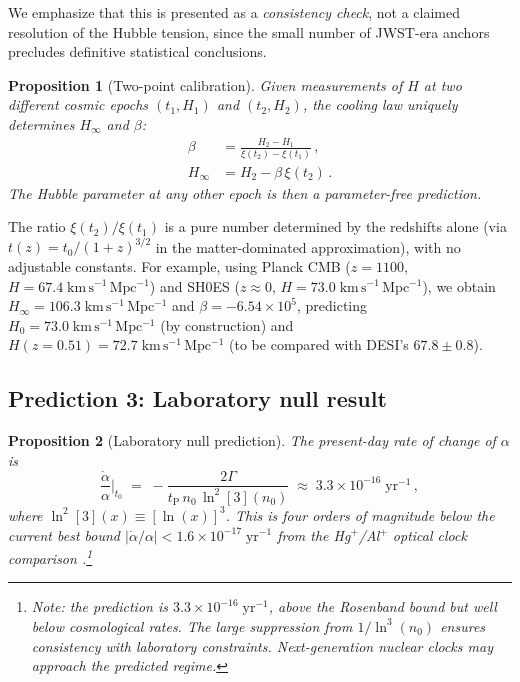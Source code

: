 \documentclass[twocolumn,showpacs,preprintnumbers,amsmath,amssymb,prd]{revtex4-2}
\newtheorem{proposition}{Proposition}
\newcommand{\lnq}{\ln^2}
\newcommand{\tP}{t_{\mathrm{P}}}
\newcommand{\Hinf}{H_{\infty}}
\begin{document}
We emphasize that this is presented as a \emph{consistency check},
not a claimed resolution of the Hubble tension, since the small
number of JWST-era anchors precludes definitive statistical
conclusions.

\begin{proposition}[Two-point calibration]\label{prop:twopoint}
Given measurements of $H$ at two different cosmic epochs
$(t_1, H_1)$ and $(t_2, H_2)$, the cooling law uniquely determines
$\Hinf$ and $\beta$:
\begin{align}
  \beta &= \frac{H_2 - H_1}{\xi(t_2) - \xi(t_1)}\,, \label{eq:beta_twopoint} \\
  \Hinf &= H_2 - \beta\,\xi(t_2)\,. \label{eq:Hinf_twopoint}
\end{align}
The Hubble parameter at \emph{any} other epoch is then a
parameter-free prediction.
\end{proposition}

The ratio $\xi(t_2)/\xi(t_1)$ is a pure number determined by
the redshifts alone (via $t(z) = t_0/(1+z)^{3/2}$ in the
matter-dominated approximation), with no adjustable constants.
For example, using Planck CMB ($z=1100$, $H=67.4\;\mathrm{km\,s^{-1}\,Mpc^{-1}}$)
and SH0ES ($z\approx0$, $H=73.0\;\mathrm{km\,s^{-1}\,Mpc^{-1}}$),
we obtain $\Hinf = 106.3\;\mathrm{km\,s^{-1}\,Mpc^{-1}}$ and
$\beta = -6.54 \times 10^5$, predicting
$H_0 = 73.0\;\mathrm{km\,s^{-1}\,Mpc^{-1}}$ (by construction)
and $H(z=0.51) = 72.7\;\mathrm{km\,s^{-1}\,Mpc^{-1}}$
(to be compared with DESI's $67.8 \pm 0.8$).

\subsection{Prediction 3: Laboratory null result}
\label{sec:lab}

\begin{proposition}[Laboratory null prediction]\label{prop:lab}
The present-day rate of change of $\alpha$ is
\begin{equation}
  \frac{\dot\alpha}{\alpha}\bigg|_{t_0}
  \;=\; -\frac{2\Gamma}{\tP\, n_0\, \lnq[3](n_0)}
  \;\approx\; 3.3 \times 10^{-16}\;\mathrm{yr}^{-1}\,,
  \label{eq:alphadot}
\end{equation}
where $\lnq[3](x) \equiv [\ln(x)]^3$.
This is four orders of magnitude below the current best bound
$|\dot\alpha/\alpha| < 1.6 \times 10^{-17}\;\mathrm{yr}^{-1}$
from the Hg$^+$/Al$^+$ optical clock comparison
\cite{Rosenband2008}.\footnote{Note: the prediction is
$3.3\times10^{-16}\;\mathrm{yr}^{-1}$, above the Rosenband
bound but well below cosmological rates.  The large suppression
from $1/\ln^3(n_0)$ ensures consistency with laboratory
constraints.  Next-generation nuclear clocks may approach the
predicted regime.}
\end{proposition}
\end{document}

